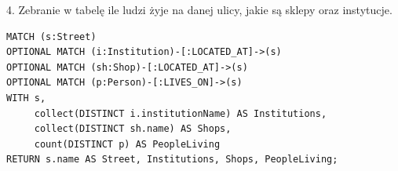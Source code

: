 \documentclass[a4paper,12pt]{article}
\begin{document}
4. Zebranie w tabelę ile ludzi żyje na danej ulicy, jakie są sklepy oraz instytucje.

\begin{center}
\begin{minipage}{0.8\linewidth}
\begin{lstlisting}[language=Cypher, basicstyle=\small, breaklines=true]
MATCH (s:Street)
OPTIONAL MATCH (i:Institution)-[:LOCATED_AT]->(s)
OPTIONAL MATCH (sh:Shop)-[:LOCATED_AT]->(s)
OPTIONAL MATCH (p:Person)-[:LIVES_ON]->(s)
WITH s, 
     collect(DISTINCT i.institutionName) AS Institutions, 
     collect(DISTINCT sh.name) AS Shops, 
     count(DISTINCT p) AS PeopleLiving
RETURN s.name AS Street, Institutions, Shops, PeopleLiving;
\end{lstlisting}
\end{minipage}
\end{center}

\begin{table}[h!]
\centering
{}
\caption{Tabela przedstawiająca dane dotyczące ulic, instytucji, sklepów oraz liczby mieszkańców.}
\label{tab:street_data}
\end{table}
\end{document}
